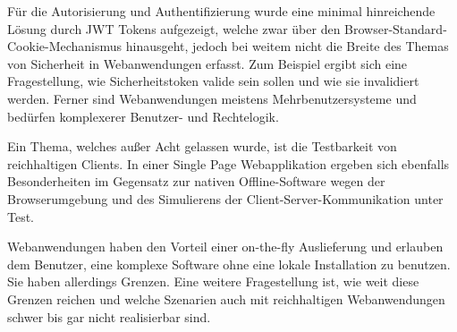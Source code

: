 Für die Autorisierung und Authentifizierung wurde eine minimal hinreichende Lösung durch JWT Tokens aufgezeigt, welche zwar über den Browser-Standard-Cookie-Mechanismus hinausgeht, jedoch bei weitem nicht die Breite des Themas von Sicherheit in Webanwendungen erfasst. Zum Beispiel ergibt sich eine Fragestellung, wie Sicherheitstoken valide sein sollen und wie sie invalidiert werden. Ferner sind Webanwendungen meistens Mehrbenutzersysteme und bedürfen komplexerer Benutzer- und Rechtelogik.

Ein Thema, welches außer Acht gelassen wurde, ist die Testbarkeit von reichhaltigen Clients. In einer Single Page Webapplikation ergeben sich ebenfalls Besonderheiten im Gegensatz zur nativen Offline-Software wegen der Browserumgebung und des Simulierens der Client-Server-Kommunikation unter Test.

Webanwendungen haben den Vorteil einer on-the-fly Auslieferung und erlauben dem Benutzer, eine komplexe Software ohne eine lokale Installation zu benutzen. Sie haben allerdings Grenzen. Eine weitere Fragestellung ist, wie weit diese Grenzen reichen und welche Szenarien auch mit reichhaltigen Webanwendungen schwer bis gar nicht realisierbar sind.
